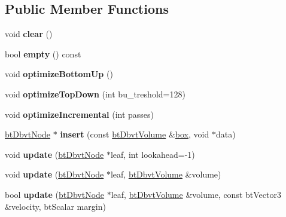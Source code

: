 \subsection*{Public Member Functions}
\begin{DoxyCompactItemize}
\item 
\hypertarget{structbt_dbvt_a91d88cec6f5e212809cb9f47a967090c}{void {\bfseries clear} ()}\label{structbt_dbvt_a91d88cec6f5e212809cb9f47a967090c}

\item 
\hypertarget{structbt_dbvt_a272b9d6210f48dc2bbde5cdf4f98e987}{bool {\bfseries empty} () const }\label{structbt_dbvt_a272b9d6210f48dc2bbde5cdf4f98e987}

\item 
\hypertarget{structbt_dbvt_a03c5cfc17ee3f6a89d86bf1028db34b0}{void {\bfseries optimize\+Bottom\+Up} ()}\label{structbt_dbvt_a03c5cfc17ee3f6a89d86bf1028db34b0}

\item 
\hypertarget{structbt_dbvt_a20c410b4825eab53cdcd2e2870e289aa}{void {\bfseries optimize\+Top\+Down} (int bu\+\_\+treshold=128)}\label{structbt_dbvt_a20c410b4825eab53cdcd2e2870e289aa}

\item 
\hypertarget{structbt_dbvt_a198643b190f8cdac7d7d62cef8cf9bb1}{void {\bfseries optimize\+Incremental} (int passes)}\label{structbt_dbvt_a198643b190f8cdac7d7d62cef8cf9bb1}

\item 
\hypertarget{structbt_dbvt_a0efd4485566228688870dc7340365d03}{\hyperlink{structbt_dbvt_node}{bt\+Dbvt\+Node} $\ast$ {\bfseries insert} (const \hyperlink{structbt_dbvt_aabb_mm}{bt\+Dbvt\+Volume} \&\hyperlink{structbox}{box}, void $\ast$data)}\label{structbt_dbvt_a0efd4485566228688870dc7340365d03}

\item 
\hypertarget{structbt_dbvt_a6efe1f6bb9abd80ea76d1bfa97cebd2b}{void {\bfseries update} (\hyperlink{structbt_dbvt_node}{bt\+Dbvt\+Node} $\ast$leaf, int lookahead=-\/1)}\label{structbt_dbvt_a6efe1f6bb9abd80ea76d1bfa97cebd2b}

\item 
\hypertarget{structbt_dbvt_a9a3ffbdaf6e85eb9ea7ac14094bcf139}{void {\bfseries update} (\hyperlink{structbt_dbvt_node}{bt\+Dbvt\+Node} $\ast$leaf, \hyperlink{structbt_dbvt_aabb_mm}{bt\+Dbvt\+Volume} \&volume)}\label{structbt_dbvt_a9a3ffbdaf6e85eb9ea7ac14094bcf139}

\item 
\hypertarget{structbt_dbvt_a49dd2a5129f72f2fef26c52d4c326c8d}{bool {\bfseries update} (\hyperlink{structbt_dbvt_node}{bt\+Dbvt\+Node} $\ast$leaf, \hyperlink{structbt_dbvt_aabb_mm}{bt\+Dbvt\+Volume} \&volume, const bt\+Vector3 \&velocity, bt\+Scalar margin)}\label{structbt_dbvt_a49dd2a5129f72f2fef26c52d4c326c8d}


\end{DoxyCompactItemize}

